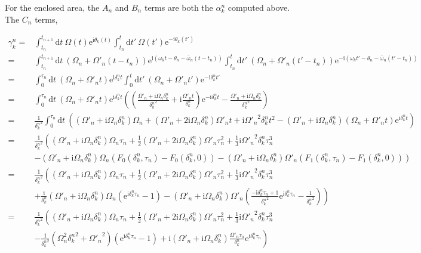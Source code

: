 \documentclass[10pt,fleqn]{article}
\newcommand{\ud}{\mathrm{d}}
\newcommand{\ue}{\mathrm{e}}
\newcommand{\ui}{\mathrm{i}}
\newcommand{\eqar}[1]
{
  \begin{align*}
    #1
  \end{align*}
}
\newcommand{\paren}[1]{{\left({#1}\right)}}
\newcommand{\lparen}[1]{{\left({#1}\right.}}
\newcommand{\rparen}[1]{{\left.{#1}\right)}}
\begin{document}
For the enclosed area, the $A_n$ and $B_n$ terms are both the $\alpha_k^n$
computed above. The $C_n$ terms,
\eqar{
  \gamma_k^n=&\int_{t_{n}}^{t_{n+1}}\!\!\ud t\ \Omega(t)\ue^{\ui\theta_k(t)}\int_{t_n}^{t}\!\!\ud t'\ \Omega(t')\ue^{-\ui\theta_k(t')}\\
  =&\int_{t_{n}}^{t_{n+1}}\!\!\ud t\ \paren{\Omega_n+\Omega'_n\paren{t-t_n}}\ue^{\ui\paren{\omega_kt-\theta_n-\bar\omega_n\paren{t-t_n}}}\int_{t_n}^{t}\!\!\ud t'\ \paren{\Omega_n+\Omega'_n\paren{t'-t_n}}\ue^{-\ui\paren{\omega_kt'-\theta_n-\bar\omega_n\paren{t'-t_n}}}\\
  =&\int_{0}^{\tau_n}\!\!\ud t\ \paren{\Omega_n+\Omega'_nt}\ue^{\ui\delta_k^nt}\int_{0}^{t}\!\!\ud t'\ \paren{\Omega_n+\Omega'_nt'}\ue^{-\ui\delta_k^nt'}\\
  =&\int_{0}^{\tau_n}\!\!\ud t\ \paren{\Omega_n+\Omega'_nt}\ue^{\ui\delta_k^nt}
  \paren{\paren{\frac{\Omega'_n+\ui\Omega_n\delta_k^n}{{\delta_k^n}^2}+\ui\frac{\Omega'_nt}{\delta_k^n}}\ue^{-\ui\delta_k^nt}-\frac{\Omega'_n+\ui\Omega_n\delta_k^n}{{\delta_k^n}^2}}\\
  =&\frac{1}{{\delta_k^n}^2}\int_{0}^{\tau_n}\!\!\ud t
  \ \paren{
    \paren{\Omega'_n+\ui\Omega_n\delta_k^n}\Omega_n
    +\paren{\Omega'_n+2\ui\Omega_n\delta_k^n}\Omega'_nt
    +\ui{\Omega'_n}^2\delta_k^nt^2
    -\paren{\Omega'_n+\ui\Omega_n\delta_k^n}\paren{\Omega_n+\Omega'_nt}
    \ue^{\ui\delta_k^nt}}\\
  =&\frac{1}{{\delta_k^n}^2}
  \lparen{\paren{\Omega'_n+\ui\Omega_n\delta_k^n}\Omega_n\tau_n+\frac{1}{2}\paren{\Omega'_n+2\ui\Omega_n\delta_k^n}\Omega'_n\tau_n^2+\frac{1}{3}\ui{\Omega'_n}^2\delta_k^n\tau_n^3}\\
  &\rparen{-\paren{\Omega'_n+\ui\Omega_n\delta_k^n}\Omega_n\paren{F_0(\delta_k^n, \tau_n)-F_0(\delta_k^n, 0)}-\paren{\Omega'_n+\ui\Omega_n\delta_k^n}\Omega'_n\paren{F_1(\delta_k^n, \tau_n)-F_1(\delta_k^n, 0)}}\\
  =&\frac{1}{{\delta_k^n}^2}
  \lparen{\paren{\Omega'_n+\ui\Omega_n\delta_k^n}\Omega_n\tau_n+\frac{1}{2}\paren{\Omega'_n+2\ui\Omega_n\delta_k^n}\Omega'_n\tau_n^2+\frac{1}{3}\ui{\Omega'_n}^2\delta_k^n\tau_n^3}\\
  &\rparen{+\frac{\ui}{{\delta_k^n}}\paren{\Omega'_n+\ui\Omega_n\delta_k^n}\Omega_n
    \paren{\ue^{\ui{\delta_k^n}\tau_n}-1}
    -\paren{\Omega'_n+\ui\Omega_n\delta_k^n}\Omega'_n
    \paren{\frac{-\ui{\delta_k^n}\tau_n + 1}{{\delta_k^n}^2}\ue^{\ui{\delta_k^n}\tau_n}
      -\frac{1}{{\delta_k^n}^2}}}\\
  =&\frac{1}{{\delta_k^n}^2}
  \lparen{\paren{\Omega'_n+\ui\Omega_n\delta_k^n}\Omega_n\tau_n+\frac{1}{2}\paren{\Omega'_n+2\ui\Omega_n\delta_k^n}\Omega'_n\tau_n^2+\frac{1}{3}\ui{\Omega'_n}^2\delta_k^n\tau_n^3}\\
  &\rparen{-\frac{1}{{\delta_k^n}^2}\paren{\Omega_n^2{\delta_k^n}^2+{\Omega'_n}^2}
    \paren{\ue^{\ui{\delta_k^n}\tau_n}-1}
    +\ui\paren{\Omega'_n+\ui\Omega_n\delta_k^n}
    \frac{\Omega'_n\tau_n}{{\delta_k^n}}\ue^{\ui{\delta_k^n}\tau_n}
  }\\
}
\end{document}
